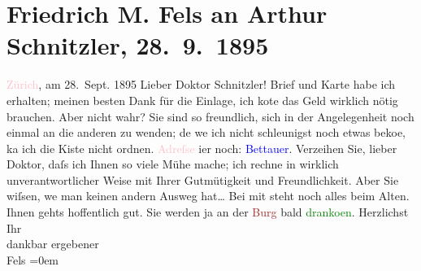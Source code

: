

               \section[Friedrich M. Fels an Arthur Schnitzler, 28. 9. 1895]{ Friedrich M. Fels an Arthur Schnitzler, 28. 9. 1895}\nopagebreak{}\rehead{ }\normalsize\beginnumbering{} \toendnotes[C]{\smallbreak\pagebreak[2]} 
\toendnotes[C]{\smallbreak}\pstart
           \raggedleft{}{\pb}\textcolor{pink}{Zürich}{}\ledrightnote{\textcolor{pink}{Zürich}}, am 28. Sept. 1895\pend
           \pstart\center{}Lieber Doktor Schnitzler!\pend\pstart
           Brief und Karte habe ich erhalten; meinen besten Dank für die Einlage, ich ko{\geminationn}te das Geld wirklich nötig brauchen. Aber nicht
                    wahr? Sie sind so freundlich, sich in der Angelegenheit noch einmal an die
                    anderen zu wenden; de{\geminationn} we{\geminationn} ich nicht \introOben{}schleunigst\introOben{}
                    noch etwas beko{\geminationm}e, ka{\geminationn}
                    ich die Kiste nicht ordnen. \textcolor{pink}{Adreſse}{} i{\geminationm}er noch: \textcolor{blue}{Bettauer}{}\ledrightnote{\textcolor{blue}{Hugo Bettauer}}.\pend
           \pstart
           Verzeihen Sie, lieber Doktor, daſs ich Ihnen so viele Mühe mache; ich rechne in
                    wirklich unverantwortlicher Weise mit Ihrer Gutmütigkeit und Freundlichkeit.
                    Aber Sie wiſsen, we{\geminationn} man keinen andern Ausweg hat{\dots}\pend
           \pstart
           Bei mit steht noch alles beim Alten. Ihnen gehts hoffentlich gut. Sie werden ja
                    an der \textcolor{brown}{Burg}{}\ledrightnote{\textcolor{brown}{Burgtheater}} bald \textcolor{green}{dranko{\geminationm}en}{}.\pend
           \pstart
           Herzlichst{\\[\baselineskip]}Ihr{\\[\baselineskip]}dankbar ergebener{\\[\baselineskip]}\spacefill\mbox{Fels}\pend
           \leftskip=0em{}\endnumbering{}  
      